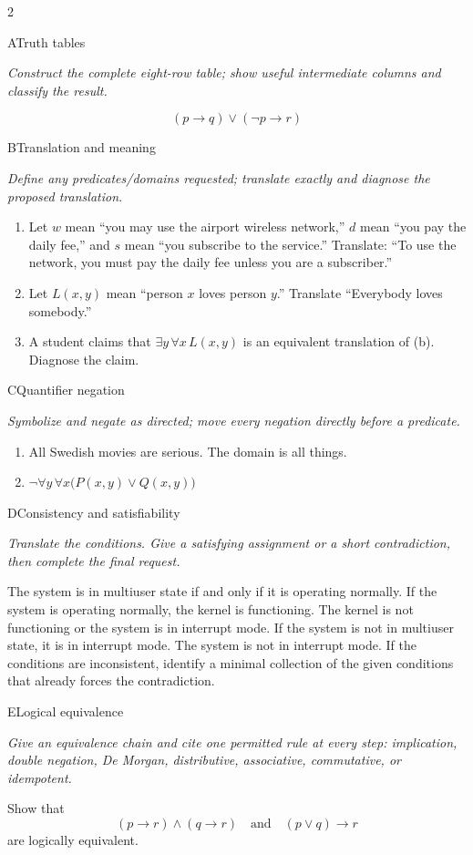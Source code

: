 \documentclass[9pt]{extarticle}
\begin{document}
\begin{multicols}{2}
\begin{CoreProblem}{A}{Truth tables}
{\scriptsize\textit{Construct the complete eight-row table; show useful intermediate columns and classify the result.}\par}
\[
  (p\to q)\lor(\neg p\to r)
\]
\end{CoreProblem}
\begin{CoreProblem}{B}{Translation and meaning}
{\scriptsize\textit{Define any predicates/domains requested; translate exactly and diagnose the proposed translation.}\par}
\begin{enumerate}[label=(\alph*)]
  \item Let $w$ mean ``you may use the airport wireless network,'' $d$ mean
        ``you pay the daily fee,'' and $s$ mean ``you subscribe to the
        service.'' Translate: ``To use the network, you must pay the daily fee
        unless you are a subscriber.''
  \item Let $L(x,y)$ mean ``person $x$ loves person $y$.'' Translate
        ``Everybody loves somebody.''
  \item A student claims that $\exists y\,\forall x\,L(x,y)$ is an equivalent
        translation of (b). Diagnose the claim.
\end{enumerate}
\end{CoreProblem}
\begin{CoreProblem}{C}{Quantifier negation}
{\scriptsize\textit{Symbolize and negate as directed; move every negation directly before a predicate.}\par}
\begin{enumerate}[label=(\alph*)]
  \item All Swedish movies are serious. The domain is all things.
  \item $\neg\forall y\,\forall x\bigl(P(x,y)\lor Q(x,y)\bigr)$
\end{enumerate}
\end{CoreProblem}
\columnbreak
\begin{CoreProblem}{D}{Consistency and satisfiability}
{\scriptsize\textit{Translate the conditions. Give a satisfying assignment or a short contradiction, then complete the final request.}\par}
The system is in multiuser state if and only if it is operating normally. If
the system is operating normally, the kernel is functioning. The kernel is not
functioning or the system is in interrupt mode. If the system is not in
multiuser state, it is in interrupt mode. The system is not in interrupt mode.
If the conditions are inconsistent, identify a minimal collection of the given
conditions that already forces the contradiction.
\end{CoreProblem}
\begin{CoreProblem}{E}{Logical equivalence}
{\scriptsize\textit{Give an equivalence chain and cite one permitted rule at every step: implication, double negation, De Morgan, distributive, associative, commutative, or idempotent.}\par}
Show that
\[
  (p\to r)\land(q\to r)
  \quad\text{and}\quad
  (p\lor q)\to r
\]
are logically equivalent.
\end{CoreProblem}
\end{multicols}
\end{document}
